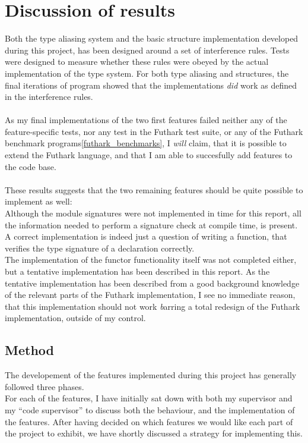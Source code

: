 \section{Discussion of results}
\label{sec:final_section}

Both the type aliasing system and the basic structure implementation developed
during this project, has been designed around a set of interference rules.
Tests were designed to measure whether these rules were obeyed by the actual
implementation of the type system.
For both type aliasing and structures, the final iterations of program showed
that the implementations \textit{did} work as defined in the interference rules.
\\
\\
As my final implementations of the two first features failed neither any of the
feature-specific tests, nor any test in the Futhark test suite, or any of the
Futhark benchmark programs\ref{futhark_benchmarks}, I \textit{will} claim, that
it is possible to extend the Futhark language, and that I am able to succesfully
add features to the code base.
\\
\\
These results suggests that the two remaining features should be quite possible
to implement as well:\\
Although the module signatures were not implemented in time for this report, all the information
needed to perform a signature check at compile time, is present. A correct
implementation is indeed just a question of writing a function, that verifies
the type signature of a declaration correctly.
\\
The implementation of the functor functionality itself was not completed either,
but a tentative implementation has been described in this report.
As the tentative implementation has been described from a good background knowledge
of the relevant parts of the Futhark implementation, I see no immediate reason,
that this implementation should not work \emph barring a total redesign of
the Futhark implementation, outside of my control.
\\

\subsection{Method}
\label{subsec:method}
The developement of the features implemented during this project has generally
followed three phases.\\
For each of the features, I have initially sat down with both my supervisor and
my ``code supervisor'' to discuss both the behaviour, and the implementation of
the features. After having decided on which features we would like each part of
the project to exhibit, we have shortly discussed a strategy for implementing
this.


